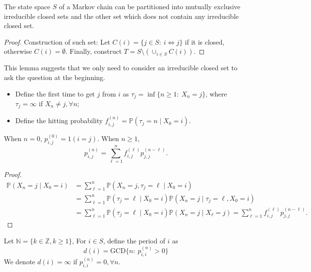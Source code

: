 \begin{proposition}
The state space $S$ of a Markov chain can be partitioned into mutually exclusive irreducible closed sets and the other set which does not contain any irreducible closed set.
\end{proposition}
\begin{proof}
Construction of such set: 
Let $C(i)=\{j\in S:~i\Leftrightarrow j\}$ if it is closed, otherwise $C(i)=\emptyset$.
Finally, construct $T=S\setminus(\cup_{i\in S}C(i))$.
\end{proof}

This lemma suggests that we only need to consider an irreducible closed set to ask the question at the beginning.

\begin{definition}
\begin{itemize}
\item
Define the first time to get $j$ from $i$ as $\tau_j=\inf\{n\ge1:~X_n=j\}$, where $\tau_j=\infty$ if $X_n\ne j,\forall n$;
\item
Define the hitting probability
$f_{i,j}^{(n)}=\mathbb{P}(\tau_j=n\mid X_0=i).
$
\end{itemize}
\end{definition}

\begin{proposition}
When $n=0$, $p_{i,j}^{(0)}=1(i=j)$.
When $n\ge1$,
\[
p_{i,j}^{(n)}=\sum_{\ell=1}^nf_{i,j}^{(\ell)}p_{j,j}^{(n-\ell)}.
\]
\end{proposition}
\begin{proof}
\begin{align*}
\mathbb{P}(X_n=j\mid X_0=i)&=\sum_{\ell=1}^n\mathbb{P}(X_n=j, \tau_j=\ell\mid X_0=i)\\
&=\sum_{\ell=1}^n\mathbb{P}(\tau_j=\ell\mid X_0=i)\mathbb{P}(X_n=j\mid \tau_j=\ell, X_0=i)\\
&=\sum_{\ell=1}^n\mathbb{P}(\tau_j=\ell\mid X_0=i)\mathbb{P}(X_n=j\mid X_\ell=j)=\sum_{\ell=1}^nf_{i,j}^{(\ell)}p_{j,j}^{(n-\ell)}.
\end{align*}
\end{proof}

\begin{definition}[Period]
Let $\mathbb{N}=\{k\in\mathbb{Z}, k\ge1\}$,
For $i\in S$, define the period of $i$ as
\[
d(i)=\text{GCD}\{n:~p_{i,i}^{(n)}>0\}
\]
We denote $d(i)=\infty$ if $p_{i,i}^{(n)}=0,\forall n$.
\end{definition}

